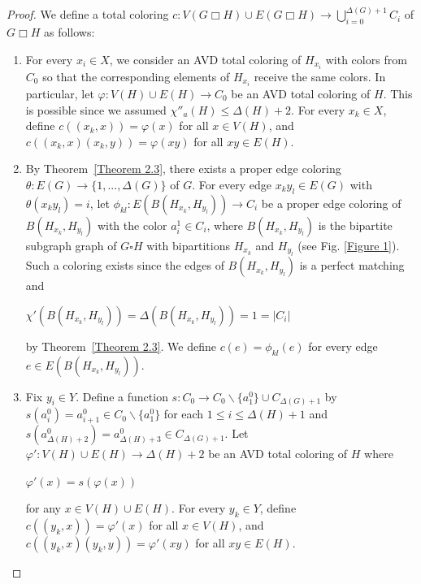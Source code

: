 \documentclass[12pt]{article}
\theoremstyle{definition}
\begin{document}
\begin{proof}
We define a total coloring $c:V(G\Box H)\cup E(G\Box H)\rightarrow \bigcup\limits_{i=0}^{\Delta(G)+1} C_i$ of $G\Box H$ as follows:

\begin{enumerate}
    \item For every $x_i\in X$, we consider an AVD total coloring of $H_{x_i}$ with colors from $C_0$ so that the corresponding elements of $H_{x_i}$ receive the same colors. In particular, let
$
\varphi:V(H)\cup E(H)\rightarrow C_0
$
be an AVD total coloring of \(H\). This is possible since we assumed $\chi''_{a}(H)\leq \Delta(H)+2$. For every \(x_k\in X\), define
$c((x_k,x))=\varphi(x)$ for all $x\in V(H)$,
and
$c((x_k,x)(x_k,y))=\varphi(xy)$ for all $xy\in E(H)$.   


\item By Theorem~\ref{Theorem 2.3}, there exists a proper edge coloring $\theta:E(G)\rightarrow \{1,...,\Delta(G)\}$ of $G$.
    For every edge $x_ky_l\in E(G)$ with $\theta(x_ky_l)=i$, 
    let $\phi_{kl}: E(B(H_{x_k},H_{y_l})) \rightarrow C_i$ be a proper edge coloring of $B(H_{x_k},H_{y_l})$ with the color $a^1_i\in C_i$, where $B(H_{x_k},H_{y_l})$ is the bipartite subgraph graph of $G\square H$ with bipartitions $H_{x_k}$ and $H_{y_l}$ (see Fig. \ref{Figure 1}). Such a coloring exists since the edges of $B(H_{x_k},H_{y_l})$ is a perfect matching and
\begin{center}
$
\chi'(B(H_{x_k},H_{y_l}))
=
\Delta(B(H_{x_k},H_{y_l}))
=
1
=
|C_i|
$
\end{center}
by Theorem~\ref{Theorem 2.3}.
We define $c(e)=\phi_{kl}(e)$ for every edge $e\in E(B(H_{x_k},H_{y_l}))$.


\item Fix $y_i\in Y$. Define a function $s:C_0\rightarrow C_0\backslash \{a^0_1\}\cup C_{\Delta(G)+1}$ by $s(a^0_i)=a^{0}_{i+1}\in  C_0\backslash \{a^0_1\}$ for each $1\leq i\leq \Delta(H)+1$ and $s(a^{0}_{\Delta(H)+2})=a_{\Delta(H)+3}^0\in C_{\Delta(G)+1}$.
Let $\varphi':V(H)\cup E(H)\rightarrow \Delta(H)+2$ be an AVD total coloring of $H$ where 
\begin{center}
$\varphi'(x)=s(\varphi(x))$     
\end{center}
for any $x\in V(H)\cup E(H)$.
For every $y_k\in Y$, define
$c((y_k,x))=\varphi'(x)$ for all $x\in V(H)$,
and
$c((y_k,x)(y_k,y))=\varphi'(xy)$ for all $xy\in E(H)$.  
\end{enumerate}


\end{proof}
\end{document}

